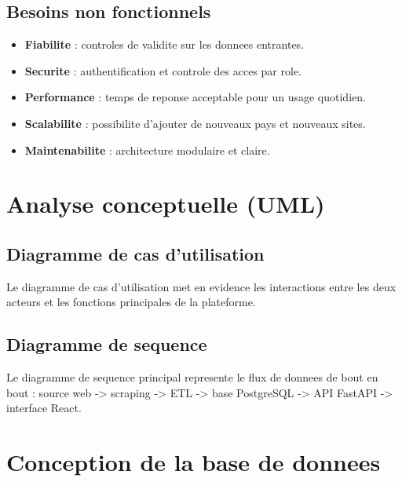 \subsection{Besoins non fonctionnels}
\begin{itemize}[leftmargin=1.2cm]
	\item \textbf{Fiabilite} : controles de validite sur les donnees entrantes.
	\item \textbf{Securite} : authentification et controle des acces par role.
	\item \textbf{Performance} : temps de reponse acceptable pour un usage quotidien.
	\item \textbf{Scalabilite} : possibilite d'ajouter de nouveaux pays et nouveaux sites.
	\item \textbf{Maintenabilite} : architecture modulaire et claire.
\end{itemize}

\section{Analyse conceptuelle (UML)}
\subsection{Diagramme de cas d'utilisation}
Le diagramme de cas d'utilisation met en evidence les interactions entre les deux acteurs et les fonctions principales de la plateforme.


\subsection{Diagramme de sequence}
Le diagramme de sequence principal represente le flux de donnees de bout en bout : source web -> scraping -> ETL -> base PostgreSQL -> API FastAPI -> interface React.


\section{Conception de la base de donnees}
